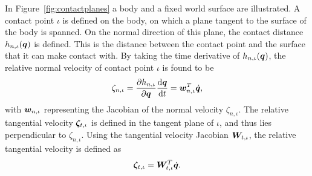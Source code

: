 \documentclass[../DC2017114Bouma.tex]{subfiles}
\begin{document}
In Figure~\ref{fig:contactplanes} a body and a fixed world surface are illustrated. A contact point $\iota$ is defined on the body, on which a plane tangent to the surface of the body is spanned. On the normal direction of this plane, the contact distance $h_{n,\iota}({\boldsymbol{q}})$ is defined. This is the distance between the contact point and the surface that it can make contact with. By taking the time derivative of $h_{n,\iota}({\boldsymbol{q}})$, the relative normal velocity of contact point $\iota$ is found to be
\begin{align}
\zeta_{n,\iota} = \frac{\partial h_{n,\iota}}{\partial{\boldsymbol{q}}}\frac{\text{d}{\boldsymbol{q}}}{\text{d} t} = {\boldsymbol{w}}_{n,\iota}^T\dot{{\boldsymbol{q}}},
\end{align}
%
%
%
%
%
%
%
%
%
%
%
%
%
%
%
%
%
%
%
%
with ${\boldsymbol{w}}_{n,\iota}$ representing the Jacobian of the normal velocity $\zeta_{n,\iota}$. The relative tangential velocity $\boldsymbol{\zeta}_{t,\iota}$ is defined in the tangent plane of $\iota$, and thus lies perpendicular to $\zeta_{n,\iota}$. Using the tangential velocity Jacobian ${\boldsymbol{W}}_{t,\iota}$, the relative tangential velocity is defined as
\begin{align}
\boldsymbol{\zeta}_{t,\iota} = {\boldsymbol{W}}_{t,\iota}^T\dot{{\boldsymbol{q}}}.
\end{align}
\end{document}
